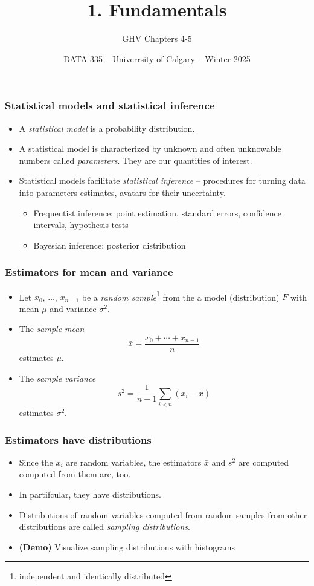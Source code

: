 \documentclass{beamer}
\title{1. Fundamentals}
\subtitle{GHV Chapters 4-5}
\institute{}
\date{DATA 335 -- Univerrsity of Calgary -- Winter 2025}
\begin{document}
\frame{\titlepage}

\begin{frame}
\frametitle{Statistical models and statistical inference}


\begin{itemize}
    \item A \emph{statistical model} is a probability distribution.
    \item A statistical model is characterized by unknown and often unknowable numbers called \emph{parameters}.
    They are our quantities of interest.
    \item Statistical models facilitate \emph{statistical inference} --
    procedures for turning data into parameters estimates,
    avatars for their uncertainty.
    \begin{itemize}
        \item Frequentist inference: point estimation, standard errors, confidence intervals, hypothesis tests
        \item Bayesian inference: posterior distribution
    \end{itemize}
\end{itemize}
\end{frame}

\begin{frame}
\frametitle{Estimators for mean and variance}
\begin{itemize}
\item Let $x_0$, $\ldots$, $x_{n - 1}$ be a
\emph{random sample}\footnote{independent and identically distributed}
from the a model (distribution) $F$ with mean $\mu$ and variance $\sigma^2$.

\item The \emph{sample mean}
$$
\bar{x} = \frac{x_0+\cdots+x_{n-1}}n
$$
estimates $\mu$.

\item The \emph{sample variance}
$$
s^2 = \frac1{n - 1}\sum_{i < n}(x_i - \bar{x})
$$
estimates $\sigma^2$.
\end{itemize}
\end{frame}

\begin{frame}
\frametitle{Estimators have distributions}

\begin{itemize}
    \item Since the $x_i$ are random variables, the estimators $\bar{x}$ and $s^2$ are computed computed from them are, too.
    \item In partifcular, they have distributions.
    \item Distributions of random variables computed from random samples from other distributions are called \emph{sampling distributions}.
    \item \textbf{(Demo)} Visualize sampling distributions with histograms
\end{itemize}
\end{frame}
\end{document}
